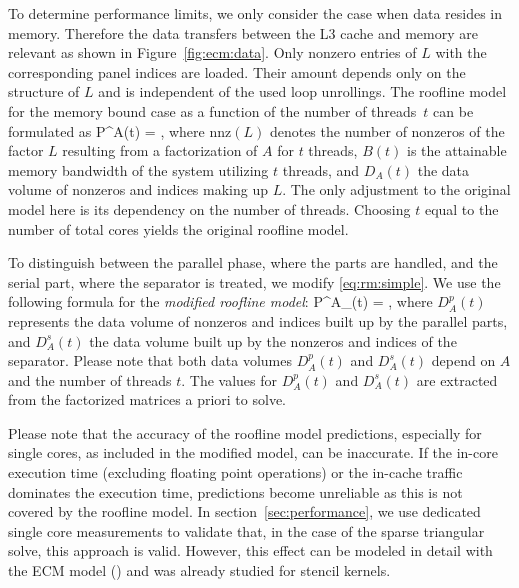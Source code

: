 To determine performance limits, we only consider the case when data resides in
memory.
Therefore the data transfers between the L3 cache and memory are relevant as shown
in Figure~\ref{fig:ecm:data}.
Only nonzero entries of $L$ with the corresponding panel indices are loaded. 
Their amount depends only on the structure of $L$ and is independent of the used
loop unrollings.
%
The roofline model for the memory bound case as a function of the number of
threads~$t$ can be formulated as
%
\be
  \label{eq:rm:simple}
  P^{A}(t)
  =  \quad {},
\ee
%
where $\text{nnz}(L)$ denotes the number of nonzeros of the factor $L$ 
resulting from a factorization of $A$ for $t$ threads, 
$B(t)$ is the attainable memory bandwidth of the system utilizing $t$ threads, and 
$D_A(t)$ the data volume of nonzeros and indices making up $L$.
The only adjustment to the original model here is its dependency on the number
of threads. 
Choosing $t$ equal to the number of total cores yields the original roofline model.

To distinguish between the parallel phase, where the parts are handled,
and the serial part, where the separator is treated, we modify 
\eqref{eq:rm:simple}.
We use the following formula for the \textit{modified roofline model}: 
%
\be
  \label{eq:rm:mod}
  P^{A}_{}(t) 
  =  \quad {},
\ee
%
where
$D_A^p(t)$ 
represents
the data volume of nonzeros and indices %
built up
by the parallel parts, and $D_A^s(t)$ the data volume %
built up by the nonzeros and
indices of the separator.
%
Please note that both data volumes $D_A^p(t)$ and $D_A^s(t)$ depend on
$A$ and the number of threads $t$.
%
The values for $D_A^p(t)$ and $D_A^s(t)$ are extracted from the factorized
matrices a priori to solve.

Please note that the accuracy of the roofline model predictions, especially for
single cores, as included in the modified model, can be inaccurate. 
If the in-core execution time (excluding floating point operations) or the in-cache
traffic dominates the execution time, predictions become unreliable as this is not
covered by the roofline model.
In section~\ref{sec:performance}, we use dedicated single core measurements to
validate that, in the case of the sparse triangular solve,
this approach is valid. 
%
However, this effect can be modeled in detail with the ECM
model (\cite{treibig-2010-ecm, hager-2012-ecm, stengel-2015}) and was already
studied for stencil kernels.


